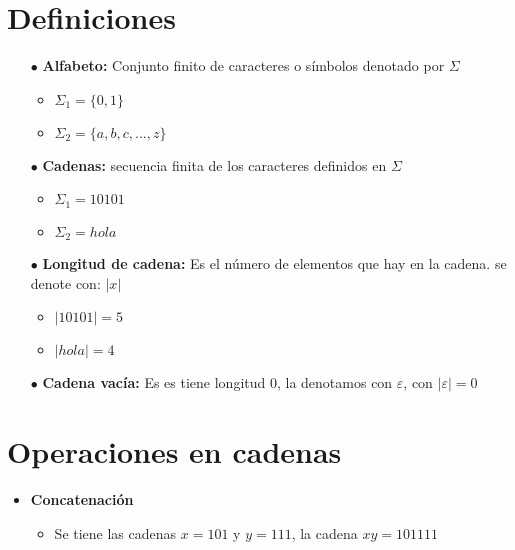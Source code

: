 \documentclass[letterpaper,12pt]{article}
\begin{document}
 
                \titulo
\Large{

\section*{Definiciones}
\begin{itemize}
    \item[$\bullet$] \textbf{Alfabeto:} Conjunto finito de caracteres o símbolos denotado por $\Sigma$
    \begin{itemize}
        \item $\Sigma_1 = \{ 0,1 \}$
        \item $\Sigma_2 = \{ a, b, c, ..., z \}$
    \end{itemize}
    
    \item[$\bullet$] \textbf{Cadenas:} secuencia finita de los caracteres definidos en $\Sigma$ 
    \begin{itemize}
        \item $\Sigma_1 = 10101 $
        \item $\Sigma_2 = hola $
    \end{itemize}
    
    \item[$\bullet$] \textbf{Longitud de cadena:} Es el número de elementos que hay en la cadena. se denote con: $|x|$
    \begin{itemize}
        \item $ |10101| = 5 $
        \item $ |hola| = 4 $
    \end{itemize}
    
    \item[$\bullet$] \textbf{Cadena vacía:} Es es tiene longitud $0$, la denotamos con $\varepsilon$, con $|\varepsilon| = 0$ 
\end{itemize}

\section*{Operaciones en cadenas}    

\begin{itemize}

    \item \textbf{Concatenación}
    \begin{itemize}
        \item Se tiene las cadenas $x = 101$ y $y = 111$, la cadena $xy = 101111$ 
    \end{itemize}
    

\end{itemize}}
\end{document}
